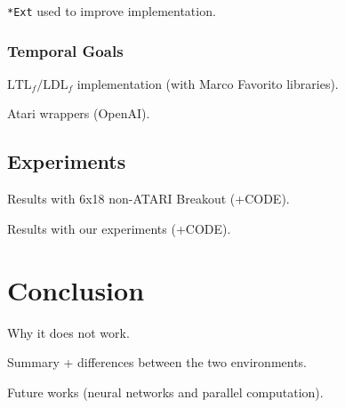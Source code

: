 \documentclass[a4paper]{article}
\begin{document}
\texttt{*Ext} used to improve implementation.

\subsubsection{Temporal Goals}
$\text{LTL}_f/\text{LDL}_f$ implementation (with Marco Favorito libraries).


Atari wrappers (OpenAI).

\subsection{Experiments}
\label{subsec:experiments}
Results with 6x18 non-ATARI Breakout (+CODE).

Results with our experiments (+CODE).

\clearpage
\section{Conclusion}
Why it does not work.

Summary + differences between the two environments.

Future works (neural networks and parallel computation).


\clearpage







\end{document}
